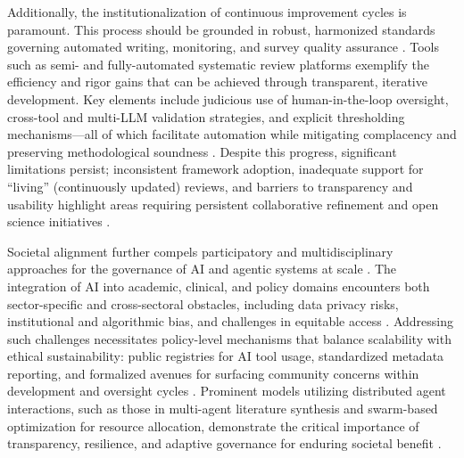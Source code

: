 \documentclass[sigconf]{acmart}
\begin{document}
Additionally, the institutionalization of continuous improvement cycles is paramount. This process should be grounded in robust, harmonized standards governing automated writing, monitoring, and survey quality assurance \cite{ref74,ref75,ref80,ref84,ref98,ref100,ref102,ref104,ref106}. Tools such as semi- and fully-automated systematic review platforms exemplify the efficiency and rigor gains that can be achieved through transparent, iterative development. Key elements include judicious use of human-in-the-loop oversight, cross-tool and multi-LLM validation strategies, and explicit thresholding mechanisms—all of which facilitate automation while mitigating complacency and preserving methodological soundness \cite{ref74,ref80,ref84,ref100,ref102,ref104}. Despite this progress, significant limitations persist; inconsistent framework adoption, inadequate support for “living” (continuously updated) reviews, and barriers to transparency and usability highlight areas requiring persistent collaborative refinement and open science initiatives \cite{ref75,ref80,ref104,ref106}.

Societal alignment further compels participatory and multidisciplinary approaches for the governance of AI and agentic systems at scale \cite{ref1,ref3,ref7,ref10,ref13,ref15,ref22,ref23,ref24,ref25,ref26,ref27,ref29,ref31,ref34,ref35,ref42,ref43,ref44,ref45,ref46,ref47,ref48,ref49,ref50,ref51,ref52,ref53,ref54,ref55,ref56,ref57,ref60,ref64,ref65,ref76,ref78,ref80,ref86,ref87,ref88,ref89,ref90,ref91,ref92,ref93,ref94,ref95,ref96,ref97,ref98,ref100,ref101,ref102,ref103,ref104,ref105,ref106,ref109,ref110,ref111,ref112,ref113,ref114,ref115,ref117}. The integration of AI into academic, clinical, and policy domains encounters both sector-specific and cross-sectoral obstacles, including data privacy risks, institutional and algorithmic bias, and challenges in equitable access \cite{ref90,ref94,ref96,ref97,ref100,ref106}. Addressing such challenges necessitates policy-level mechanisms that balance scalability with ethical sustainability: public registries for AI tool usage, standardized metadata reporting, and formalized avenues for surfacing community concerns within development and oversight cycles \cite{ref95,ref106,ref110,ref113}. Prominent models utilizing distributed agent interactions, such as those in multi-agent literature synthesis and swarm-based optimization for resource allocation, demonstrate the critical importance of transparency, resilience, and adaptive governance for enduring societal benefit \cite{ref31,ref34,ref35,ref47,ref49,ref55}.
\end{document}
